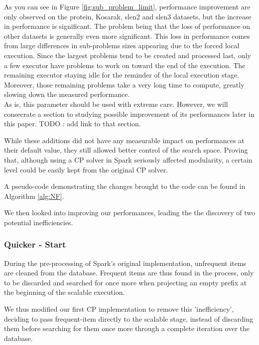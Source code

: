 \documentclass{eplmastersthesis}
\begin{document}
\begin{enumerate}
	 As you can see in Figure \ref{fig:sub_problem_limit}, performance improvement are only observed on the protein, Kosarak, slen2 and slen3 datasets, but the increase in performance is significant. The problem being that the loss of performance on other datasets is generally even more significant. This loss in performance comes from large differences in sub-problems sizes appearing due to the forced local execution. Since the largest problems tend to be created and processed last, only a few executor have problems to work on toward the end of the execution. The remaining executor staying idle for the reminder of the local execution stage. Moreover, those remaining problems take a very long time to compute, greatly slowing down the measured performance. \\
	 As is, this parameter should be used with extreme care. However, we will consecrate a section to studying possible improvement of its performances later in this paper. TODO : add link to that section.
\end{enumerate}

While these additions did not have any measurable impact on performances at their default value, they still allowed better control of the search space. Proving that, although using a CP solver in Spark seriously affected modularity, a certain level could be easily kept from the original CP solver. \newline

A pseudo-code demonstrating the changes brought to the code can be found in Algorithm \ref{alg:NF}.

We then looked into improving our performances, leading the the discovery of two potential inefficiencies.

\subsubsection{Quicker - Start}

During the pre-processing of Spark's original implementation, unfrequent items are cleaned from the database. Frequent items are thus found in the process, only to be discarded and searched for once more when projecting an empty prefix at the beginning of the scalable execution. \newline

We thus modified our first CP implementation to remove this 'inefficiency', deciding to pass frequent-item directly to the scalable stage, instead of discarding them before searching for them once more through a complete iteration over the database. \newline
\end{document}
